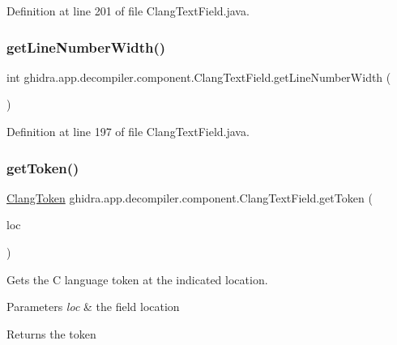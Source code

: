 Definition at line 201 of file Clang\+Text\+Field.\+java.

\mbox{\label{classghidra_1_1app_1_1decompiler_1_1component_1_1_clang_text_field_afba7d93059347f885780270087d65537}} 
\subsubsection{\texorpdfstring{getLineNumberWidth()}{getLineNumberWidth()}}
{\footnotesize\ttfamily int ghidra.\+app.\+decompiler.\+component.\+Clang\+Text\+Field.\+get\+Line\+Number\+Width (\begin{DoxyParamCaption}{ }\end{DoxyParamCaption})\hspace{0.3cm}{\ttfamily [inline]}}



Definition at line 197 of file Clang\+Text\+Field.\+java.

\mbox{\label{classghidra_1_1app_1_1decompiler_1_1component_1_1_clang_text_field_a7c4539de6243e532d433b2a2deb13645}} 
\subsubsection{\texorpdfstring{getToken()}{getToken()}}
{\footnotesize\ttfamily \mbox{\hyperlink{classghidra_1_1app_1_1decompiler_1_1_clang_token}{Clang\+Token}} ghidra.\+app.\+decompiler.\+component.\+Clang\+Text\+Field.\+get\+Token (\begin{DoxyParamCaption}\item[{Field\+Location}]{loc }\end{DoxyParamCaption})\hspace{0.3cm}{\ttfamily [inline]}}

Gets the C language token at the indicated location. 
\begin{DoxyParams}{Parameters}
{\em loc} & the field location \\
\hline
\end{DoxyParams}
\begin{DoxyReturn}{Returns}
the token 
\end{DoxyReturn}


